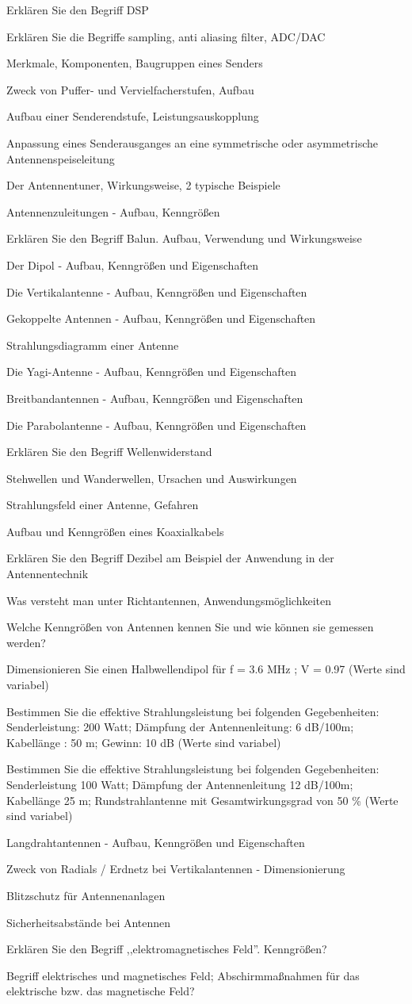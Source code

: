 \documentclass[avery5371,grid,frame,a4paper]{flashcards}
\newcommand\question[2]{
  \begin{flashcard}[{\chap} -- #1]{#2}\end{flashcard}
}
\begin{document}
\question{55}{Erklären Sie den Begriff DSP}
\question{56}{Erklären Sie die Begriffe sampling, anti aliasing filter, ADC/DAC}
\question{57}{Merkmale, Komponenten, Baugruppen eines Senders}
\question{58}{Zweck von Puffer- und Vervielfacherstufen, Aufbau}
\question{59}{Aufbau einer Senderendstufe, Leistungsauskopplung}
\question{60}{Anpassung eines Senderausganges an eine symmetrische oder asymmetrische Antennenspeiseleitung}
\question{61}{Der Antennentuner, Wirkungsweise, 2 typische Beispiele}
\question{62}{Antennenzuleitungen - Aufbau, Kenngrößen}
\question{63}{Erklären Sie den Begriff Balun. Aufbau, Verwendung und Wirkungsweise}
\question{64}{Der Dipol - Aufbau, Kenngrößen und Eigenschaften}
\question{65}{Die Vertikalantenne - Aufbau, Kenngrößen und Eigenschaften}
\question{66}{Gekoppelte Antennen - Aufbau, Kenngrößen und Eigenschaften}
\question{67}{Strahlungsdiagramm einer Antenne}
\question{68}{Die Yagi-Antenne - Aufbau, Kenngrößen und Eigenschaften}
\question{69}{Breitbandantennen - Aufbau, Kenngrößen und Eigenschaften}
\question{70}{Die Parabolantenne - Aufbau, Kenngrößen und Eigenschaften}
\question{71}{Erklären Sie den Begriff Wellenwiderstand}
\question{72}{Stehwellen und Wanderwellen, Ursachen und Auswirkungen}
\question{73}{Strahlungsfeld einer Antenne, Gefahren}
\question{74}{Aufbau und Kenngrößen eines Koaxialkabels}
\question{75}{Erklären Sie den Begriff Dezibel am Beispiel der Anwendung in der Antennentechnik}
\question{76}{Was versteht man unter Richtantennen, Anwendungsmöglichkeiten}
\question{77}{Welche Kenngrößen von Antennen kennen Sie und wie können sie gemessen werden?}
\question{78}{Dimensionieren Sie einen Halbwellendipol für f = 3.6 MHz ; V = 0.97 (Werte sind variabel)}
\question{79}{Bestimmen Sie die effektive Strahlungsleistung bei folgenden Gegebenheiten: Senderleistung: 200 Watt; Dämpfung der Antennenleitung: 6 dB/100m; Kabellänge : 50 m; Gewinn: 10 dB (Werte sind variabel)}
\question{80}{Bestimmen Sie die effektive Strahlungsleistung bei folgenden Gegebenheiten: Senderleistung 100 Watt; Dämpfung der Antennenleitung 12 dB/100m; Kabellänge 25 m; Rundstrahlantenne mit Gesamtwirkungsgrad von 50 \% (Werte sind variabel)}
\question{81}{Langdrahtantennen - Aufbau, Kenngrößen und Eigenschaften}
\question{82}{Zweck von Radials / Erdnetz bei Vertikalantennen - Dimensionierung}
\question{83}{Blitzschutz für Antennenanlagen}
\question{84}{Sicherheitsabstände bei Antennen}
\question{85}{Erklären Sie den Begriff ,,elektromagnetisches Feld''. Kenngrößen?}
\question{86}{Begriff elektrisches und magnetisches Feld; Abschirmmaßnahmen für das elektrische bzw. das magnetische Feld?}
\end{document}
